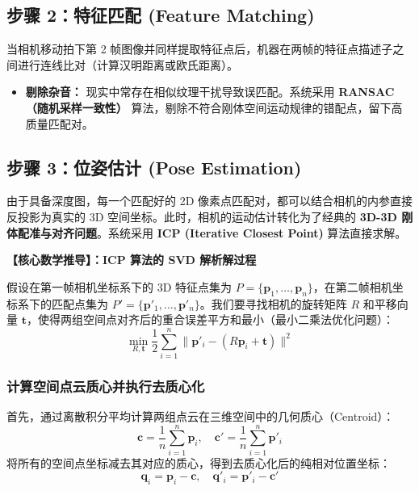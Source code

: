 \documentclass[12pt,a4paper]{article}
\begin{document}
\subsection{步骤 2：特征匹配 (Feature Matching)}
当相机移动拍下第 2 帧图像并同样提取特征点后，机器在两帧的特征点描述子之间进行连线比对（计算汉明距离或欧氏距离）。
\begin{itemize}
    \item \textbf{剔除杂音：} 现实中常存在相似纹理干扰导致误匹配。系统采用 \textbf{RANSAC（随机采样一致性）} 算法，剔除不符合刚体空间运动规律的错配点，留下高质量匹配对。
\end{itemize}

\subsection{步骤 3：位姿估计 (Pose Estimation)}
由于具备深度图，每一个匹配好的 2D 像素点匹配对，都可以结合相机的内参直接反投影为真实的 3D 空间坐标。此时，相机的运动估计转化为了经典的 \textbf{3D-3D 刚体配准与对齐问题}。系统采用 \textbf{ICP (Iterative Closest Point)} 算法直接求解。

\vspace{0.3cm}
\textbf{【核心数学推导】：ICP 算法的 SVD 解析解过程}

假设在第一帧相机坐标系下的 3D 特征点集为 $P = \{\mathbf{p}_1, \dots, \mathbf{p}_n\}$，在第二帧相机坐标系下的匹配点集为 $P' = \{\mathbf{p}'_1, \dots, \mathbf{p}'_n\}$。我们要寻找相机的旋转矩阵 $R$ 和平移向量 $\mathbf{t}$，使得两组空间点对齐后的重合误差平方和最小（最小二乘法优化问题）：
\begin{equation}
    \min_{R,\mathbf{t}} \frac{1}{2} \sum_{i=1}^{n} \| \mathbf{p}'_i - (R \mathbf{p}_i + \mathbf{t}) \|^2
\end{equation}

\subsubsection{计算空间点云质心并执行去质心化}
首先，通过离散积分平均计算两组点云在三维空间中的几何质心（Centroid）：
\begin{equation}
    \mathbf{c} = \frac{1}{n} \sum_{i=1}^{n} \mathbf{p}_i, \quad \mathbf{c}' = \frac{1}{n} \sum_{i=1}^{n} \mathbf{p}'_i
\end{equation}
将所有的空间点坐标减去其对应的质心，得到去质心化后的纯相对位置坐标：
\begin{equation}
    \mathbf{q}_i = \mathbf{p}_i - \mathbf{c}, \quad \mathbf{q}'_i = \mathbf{p}'_i - \mathbf{c}'
\end{equation}
\end{document}
